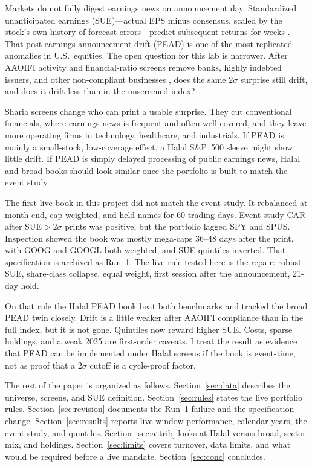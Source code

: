 \documentclass[11pt,letterpaper]{article}
\begin{document}
Markets do not fully digest earnings news on announcement day. Standardized unanticipated earnings (SUE)---actual EPS minus consensus, scaled by the stock's own history of forecast errors---predict subsequent returns for weeks \citep{ball1968,foster1984,bernard1989,bernard1990}. That post-earnings announcement drift (PEAD) is one of the most replicated anomalies in U.S.\ equities. The open question for this lab is narrower. After AAOIFI activity and financial-ratio screens remove banks, highly indebted issuers, and other non-compliant businesses \citep{aaoifi21,derigs2008}, does the same $2\sigma$ surprise still drift, and does it drift less than in the unscreened index?

Sharia screens change who can print a usable surprise. They cut conventional financials, where earnings news is frequent and often well covered, and they leave more operating firms in technology, healthcare, and industrials. If PEAD is mainly a small-stock, low-coverage effect, a Halal S\&P~500 sleeve might show little drift. If PEAD is simply delayed processing of public earnings news, Halal and broad books should look similar once the portfolio is built to match the event study.

The first live book in this project did not match the event study. It rebalanced at month-end, cap-weighted, and held names for 60 trading days. Event-study CAR after SUE$>2\sigma$ prints was positive, but the portfolio lagged SPY and SPUS. Inspection showed the book was mostly mega-caps 36--48 days after the print, with GOOG and GOOGL both weighted, and SUE quintiles inverted. That specification is archived as Run~1. The live rule tested here is the repair: robust SUE, share-class collapse, equal weight, first session after the announcement, 21-day hold.

On that rule the Halal PEAD book beat both benchmarks and tracked the broad PEAD twin closely. Drift is a little weaker after AAOIFI compliance than in the full index, but it is not gone. Quintiles now reward higher SUE. Costs, sparse holdings, and a weak 2025 are first-order caveats. I treat the result as evidence that PEAD can be implemented under Halal screens if the book is event-time, not as proof that a $2\sigma$ cutoff is a cycle-proof factor.

The rest of the paper is organized as follows. Section~\ref{sec:data} describes the universe, screens, and SUE definition. Section~\ref{sec:rules} states the live portfolio rules. Section~\ref{sec:revision} documents the Run~1 failure and the specification change. Section~\ref{sec:results} reports live-window performance, calendar years, the event study, and quintiles. Section~\ref{sec:attrib} looks at Halal versus broad, sector mix, and holdings. Section~\ref{sec:limits} covers turnover, data limits, and what would be required before a live mandate. Section~\ref{sec:conc} concludes.
\end{document}
